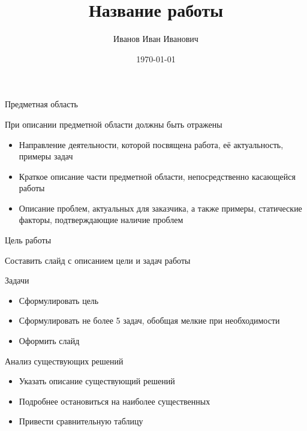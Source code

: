 \documentclass{../cls/fefu_presentation}
\author{Иванов Иван Иванович}
\title{Название работы}
\date{\today}
\begin{document}
    
    \presentationtitlepage
    
    
    \begin{frame}{Предметная область}
        \begin{block}{}
            При описании предметной области должны быть отражены
            \begin{itemize}
                \item Направление деятельности, которой посвящена работа, её актуальность, примеры задач
                \item Краткое описание части предметной области, непосредственно касающейся работы
                \item Описание проблем, актуальных для заказчика, а также примеры, статические факторы, подтверждающие наличие проблем
            \end{itemize}
        \end{block}
    \end{frame}

    \note{}
    
    \begin{frame}{Цель работы}
        \begin{block}{}
            Составить слайд с описанием цели и задач работы
        \end{block}
        \begin{block}{Задачи}
            \begin{itemize}
                \item Сформулировать цель
                \item Сформулировать не более 5 задач, обобщая мелкие при необходимости
                \item Оформить слайд
            \end{itemize}
        \end{block}
    \end{frame}

    \note{}
    
    \begin{frame}{Анализ существующих решений}
        \begin{block}{}
            \begin{itemize}
                \item Указать описание существующий решений
                \item Подробнее остановиться на наиболее существенных
                \item Привести сравнительную таблицу
            \end{itemize}
        \end{block}
    \end{frame}
\end{document}
